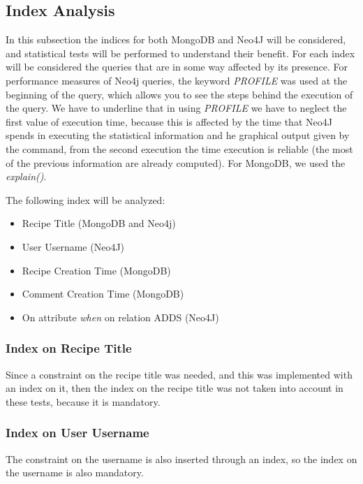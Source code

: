 \documentclass[a4paper]{report}
\begin{document}
\subsection{Index Analysis}

In this subsection the indices for both MongoDB and Neo4J will be considered, and statistical tests will be performed to understand their benefit. For each index will be considered the queries that are in some way affected by its presence. For performance measures of Neo4j queries, the keyword \emph{PROFILE} was used at the beginning of the query, which allows you to see the steps behind the execution of the query. We have to underline that in using \emph{PROFILE} we have to neglect the first value of execution time, because this is affected by the time that Neo4J spends in executing the statistical information and he graphical output given by the command, from the second execution the time execution is reliable (the most of the previous information are already computed). For MongoDB, we used the \emph{explain()}.

\noindent The following index will be analyzed:
\begin{itemize}
	\item Recipe Title (MongoDB and Neo4j)
	\item User Username (Neo4J)
	\item Recipe Creation Time (MongoDB)
	\item Comment Creation Time (MongoDB)
	\item On attribute \emph{when} on relation ADDS (Neo4J)	
\end{itemize}

\subsubsection {Index on Recipe Title}
Since a constraint on the recipe title was needed, and this was implemented with an index on it, then the index on the recipe title was not taken into account in these tests, because it is mandatory.

\subsubsection {Index on User Username}
The constraint on the username is also inserted through an index, so the index on the username is also mandatory.
\end{document}
